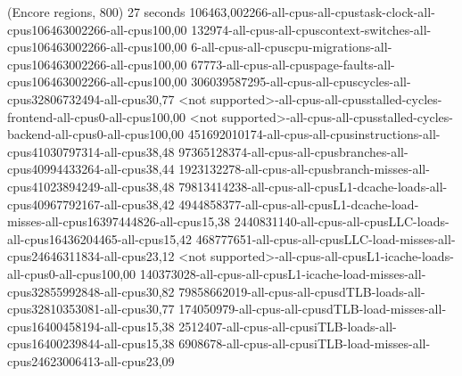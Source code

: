 (Encore regions, 800)
27 seconds
106463,002266-all-cpus-all-cpustask-clock-all-cpus106463002266-all-cpus100,00
132974-all-cpus-all-cpuscontext-switches-all-cpus106463002266-all-cpus100,00
6-all-cpus-all-cpuscpu-migrations-all-cpus106463002266-all-cpus100,00
67773-all-cpus-all-cpuspage-faults-all-cpus106463002266-all-cpus100,00
306039587295-all-cpus-all-cpuscycles-all-cpus32806732494-all-cpus30,77
<not supported>-all-cpus-all-cpusstalled-cycles-frontend-all-cpus0-all-cpus100,00
<not supported>-all-cpus-all-cpusstalled-cycles-backend-all-cpus0-all-cpus100,00
451692010174-all-cpus-all-cpusinstructions-all-cpus41030797314-all-cpus38,48
97365128374-all-cpus-all-cpusbranches-all-cpus40994433264-all-cpus38,44
1923132278-all-cpus-all-cpusbranch-misses-all-cpus41023894249-all-cpus38,48
79813414238-all-cpus-all-cpusL1-dcache-loads-all-cpus40967792167-all-cpus38,42
4944858377-all-cpus-all-cpusL1-dcache-load-misses-all-cpus16397444826-all-cpus15,38
2440831140-all-cpus-all-cpusLLC-loads-all-cpus16436204465-all-cpus15,42
468777651-all-cpus-all-cpusLLC-load-misses-all-cpus24646311834-all-cpus23,12
<not supported>-all-cpus-all-cpusL1-icache-loads-all-cpus0-all-cpus100,00
140373028-all-cpus-all-cpusL1-icache-load-misses-all-cpus32855992848-all-cpus30,82
79858662019-all-cpus-all-cpusdTLB-loads-all-cpus32810353081-all-cpus30,77
174050979-all-cpus-all-cpusdTLB-load-misses-all-cpus16400458194-all-cpus15,38
2512407-all-cpus-all-cpusiTLB-loads-all-cpus16400239844-all-cpus15,38
6908678-all-cpus-all-cpusiTLB-load-misses-all-cpus24623006413-all-cpus23,09
